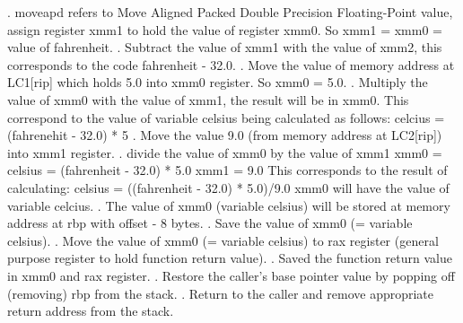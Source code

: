 \documentclass{article}
\theoremstyle{theorem}
\theoremstyle{definition}
\theoremstyle{remark}
\begin{document}
\newline {}. moveapd refers to Move Aligned Packed Double Precision Floating-Point value, assign register xmm1 to hold the value of register xmm0. So xmm1 = xmm0 = value of fahrenheit. 
\newline {}. Subtract the value of xmm1 with the value of xmm2, this corresponds to the code fahrenheit - 32.0.
\newline {}. Move the value of memory address at LC1[rip] which holds 5.0 into xmm0 register. So xmm0 = 5.0.
\newline {}. Multiply the value of xmm0 with the value of xmm1, the result will be in xmm0. This correspond to the value of variable celsius being calculated as follows:
celcius = (fahrenehit - 32.0) * 5 
\newline {}. Move the value 9.0 (from memory address at LC2[rip]) into xmm1 register.
\newline {}. divide the value of xmm0 by the value of xmm1 
\newline \indent \indent xmm0 = celsius = (fahrenheit - 32.0) * 5.0
\newline \indent \indent xmm1 = 9.0
\newline This corresponds to the result of calculating: 
\newline \indent \indent celsius = ((fahrenheit - 32.0) * 5.0)/9.0
\newline  \indent xmm0 will have the value of variable celcius.
\newline {}. The value of xmm0 (variable celsius) will be stored at memory address at rbp with offset - 8 bytes.
\newline {}. Save the value of xmm0 (= variable celsius).
\newline {}. Move the value of xmm0 (= variable celsius) to rax register (general purpose register to hold function return value).
\newline {}. Saved the function return value in xmm0 and rax register.
\newline {}. Restore the caller's base pointer value by popping off (removing) rbp from the stack.
\newline {}. Return to the caller and remove appropriate return address from the stack.
\end{document}
